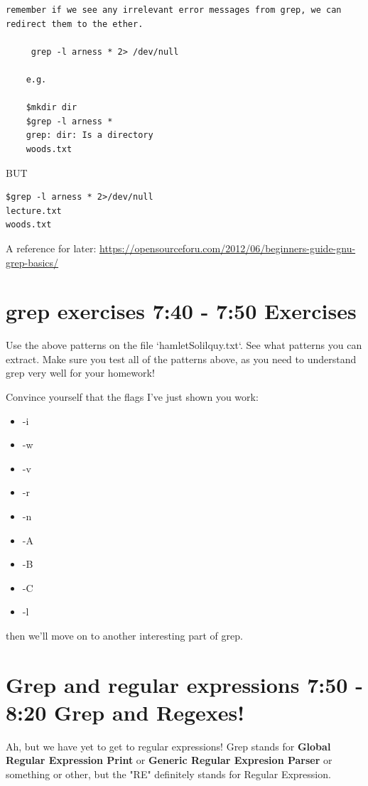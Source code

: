 \documentclass[10pt]{article}
\begin{document}
\begin{verbatim}
remember if we see any irrelevant error messages from grep, we can redirect them to the ether.

     grep -l arness * 2> /dev/null

    e.g.
    
	$mkdir dir
    $grep -l arness *
    grep: dir: Is a directory
    woods.txt
\end{verbatim}   
 
    BUT

\begin{lstlisting}[style=term]    
$grep -l arness * 2>/dev/null
lecture.txt
woods.txt
\end{lstlisting}

A reference for later:
\url{https://opensourceforu.com/2012/06/beginners-guide-gnu-grep-basics/}

\section{grep exercises 7:40 - 7:50  Exercises}

Use the above patterns on the file `hamletSolilquy.txt`. See what patterns you can extract. Make sure you test all of the patterns above, as you need to understand grep very well for your homework!

Convince yourself that the flags I've just shown you work:
\begin{itemize}
\item -i
\item -w
\item -v
\item -r
\item -n
\item -A
\item -B
\item -C
\item -l
\end{itemize}

then we'll move on to another interesting part of grep.

\section{Grep and regular expressions 7:50 - 8:20  Grep and Regexes!}

Ah, but we have yet to get to regular expressions! Grep stands for
\textbf{Global Regular Expression Print} or \textbf{Generic Regular Expresion
Parser} or something or other, but the "RE" definitely stands for Regular
Expression.
\end{document}
